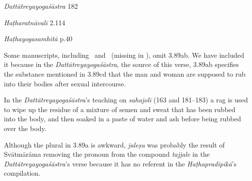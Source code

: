 \begin{ekdosis}
\begin{sources}[hp03_089]
\emph{Dattātreyayogaśāstra} 182
\begin{versinnote}
\tl{\var{182a tajjale bhasma saṃkṣipya ] M2; tajjale bhasmasāt kṣipya M1, tajjale bhasma saddravyaṃ A}\\!}
\end{versinnote}

\end{sources}

\begin{testimonia}[hp03_089]
\emph{Haṭharatnāvalī} 2.114
\begin{versinnote}
\end{versinnote}

\emph{Haṭhayogasamhitā} p.40
\begin{versinnote}
\end{versinnote}
\end{testimonia}

\begin{philcomm}[hp03_089]
Some manuscripts, including \alphaTwo\ and \alphaThree\ (missing in \alphaOne), omit 3.89ab. We have included it because in the \emph{Dattātreyayogaśāstra}, the source of this verse, 3.89ab specifies the substance mentioned in 3.89cd that the man and woman are supposed to rub into their bodies after sexual intercourse.\lb

In the \emph{Dattātreyayogaśāstra}’s teaching on \emph{sahajolī} (163 and 181–183) a rag is used to wipe up the residue of a mixture of semen and sweat that has been rubbed into the body, and then soaked in a paste of water and ash before being rubbed over the body.\lb

Although the plural in 3.89a is awkward, \emph{jaleṣu} was probably the result of Svātmārāma removing the pronoun from the compound \emph{tajjale} in the \emph{Dattātreyayogaśāstra}'s verse because it has no referent in the \emph{Haṭhapradīpikā}'s compilation.
\end{philcomm}


\end{ekdosis}
